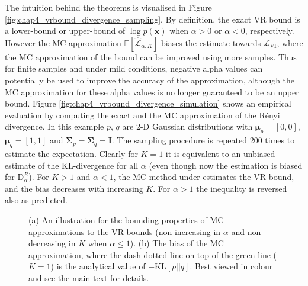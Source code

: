 %
The intuition behind the theorems is visualised in Figure \ref{fig:chap4_vrbound_divergence_sampling}. By definition, the exact VR bound is a lower-bound or upper-bound of $\log p(\bm{x})$ when $\alpha > 0$ or $\alpha < 0$, respectively. However the MC approximation $\mathbb{E}[\hat{\mathcal{L}}_{\alpha, K}]$ biases the estimate towards $\mathcal{L}_{\text{VI}}$, where the MC approximation of the bound can be improved using more samples. Thus for finite samples and under mild conditions, negative alpha values can potentially be used to improve the accuracy of the approximation, although the MC approximation for these alpha values is no longer guaranteed to be an upper bound.
%
Figure \ref{fig:chap4_vrbound_divergence_simulation} shows an empirical evaluation by computing the exact and the MC approximation of the R{\'e}nyi divergence. In this example $p$, $q$ are 2-D Gaussian distributions with $\bm{\mu}_p = [0, 0]$, $\bm{\mu}_q = [1, 1]$ and $\bm{\Sigma}_p = \bm{\Sigma}_q = \bm{I}$. The sampling procedure is repeated 200 times to estimate the expectation. Clearly for $K = 1$ it is equivalent to an unbiased estimate of the KL-divergence for all $\alpha$ (even though now the estimation is biased for $\mathrm{D}_{\alpha}^{R}$). For $K > 1$ and $\alpha < 1$, the MC method under-estimates the VR bound, and the bias decreases with increasing $K$. For $\alpha > 1$ the inequality is reversed also as predicted.


\begin{figure*}[t]
 \centering
 \hspace{0.1in}
 \vspace{-0.1in}
 \caption{(a) An illustration for the bounding properties of MC approximations to the VR bounds (non-increasing in $\alpha$ and non-decreasing in $K$ when $\alpha \leq 1$). (b) The bias of the MC approximation, where the dash-dotted line on top of the green line ($K=1$) is the analytical value of $-\mathrm{KL}[p||q]$. Best viewed in colour and see the main text for details.}
\end{figure*}